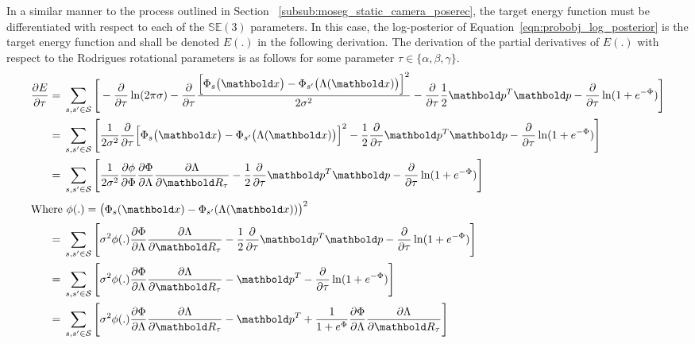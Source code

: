 In a similar manner to the process outlined in Section
~\ref{subsub:moseg_static_camera_poserec}, the target energy function must be
differentiated with respect to each of the \(\mathbb{SE}(3)\) parameters. In this
case, the log-posterior of Equation~\ref{eqn:probobj_log_posterior} is the
target energy function and shall be denoted \(E(.)\) in the following derivation.
The derivation of the partial derivatives of \(E(.)\) with respect
to the Rodrigues rotational parameters is as follows for some parameter
\( \tau \in \{ \alpha, \beta, \gamma \} \).
\begin{align}
  \label{eqn:probobj_log_post_rot_grad}
  \frac{\partial E}{\partial \tau} ={}&
  \sum_{s, s' \in \mathcal{S}} \Bigg[ - \frac{\partial}{\partial \tau}
  \ln(2\pi\sigma) - \frac{\partial}{\partial \tau}
  \frac{{\Big[\Phi_{s}\big(\bm{x}\big) -
  \Phi_{s'}\big(\Lambda(\bm{x})\big)\Big]}^{2}}{2\sigma^{2}} -
  \frac{\partial}{\partial \tau} \frac{1}{2} \bm{p}^{T}\bm{p} -
  \frac{\partial}{\partial \tau} \ln(1 + e^{-\Phi})
  \Bigg]\\
  ={}& \sum_{s, s' \in \mathcal{S}} \Bigg[ \frac{1}{2\sigma^{2}}
  \frac{\partial}{\partial \tau}
  {\Big[\Phi_{s}\big(\bm{x}\big) - \Phi_{s'}\big(\Lambda(\bm{x})\big)\Big]}^{2} -
  \frac{1}{2} \frac{\partial}{\partial \tau}
  \bm{p}^{T}\bm{p} - \frac{\partial}{\partial \tau} \ln(1 + e^{-\Phi})
  \Bigg]\\
  ={}& \sum_{s, s' \in \mathcal{S}} \Bigg[ \frac{1}{2\sigma^{2}}
  \frac{\partial \phi}{\partial \Phi} \frac{\partial \Phi}{\partial \Lambda}
  \frac{\partial \Lambda}{\partial \bm{R}_{\tau}} -
  \frac{1}{2} \frac{\partial}{\partial \tau}
  \bm{p}^{T}\bm{p} - \frac{\partial}{\partial \tau} \ln(1 + e^{-\Phi})
  \Bigg]\\
  \shortintertext{Where \(\phi(.) =
  {\big(\Phi_{s}(\bm{x}) - \Phi_{s'}(\Lambda(\bm{x}))\big)}^{2}\)}
  ={}& \sum_{s, s' \in \mathcal{S}} \Bigg[ \sigma^{2} \phi(.)
  \frac{\partial \Phi}{\partial \Lambda}
  \frac{\partial \Lambda}{\partial \bm{R}_{\tau}} -
  \frac{1}{2} \frac{\partial}{\partial \tau}
  \bm{p}^{T}\bm{p} - \frac{\partial}{\partial \tau} \ln(1 + e^{-\Phi})
  \Bigg]\\
  ={}& \sum_{s, s' \in \mathcal{S}} \Bigg[ \sigma^{2} \phi(.)
  \frac{\partial \Phi}{\partial \Lambda}
  \frac{\partial \Lambda}{\partial \bm{R}_{\tau}} - \bm{p}^{T} -
  \frac{\partial}{\partial \tau} \ln(1 + e^{-\Phi})
    \Bigg]\\
  ={}& \sum_{s, s' \in \mathcal{S}} \Bigg[ \sigma^{2} \phi(.)
  \frac{\partial \Phi}{\partial \Lambda}
  \frac{\partial \Lambda}{\partial \bm{R}_{\tau}} - \bm{p}^{T} +
  \frac{1}{1 + e^{\Phi}} \frac{\partial \Phi}{\partial \Lambda}
  \frac{\partial \Lambda}{\partial \bm{R}_{\tau}} \Bigg]
\end{align}

